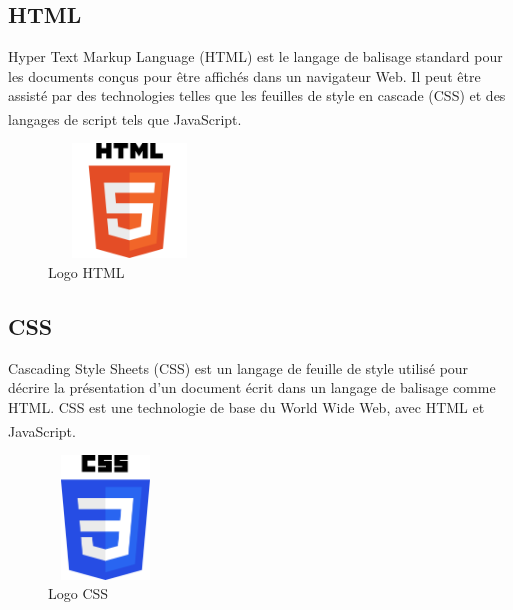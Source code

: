 \documentclass[12pt]{report}
\begin{document}
\subsection{HTML}

Hyper Text Markup Language (HTML) est le langage de balisage standard pour les documents conçus pour être affichés dans un navigateur Web. Il peut être assisté par des technologies telles que les feuilles de style en cascade (CSS) et des langages de script tels que JavaScript.\textsuperscript{\cite{robbins2012learning}}

\vspace{0.05in}

\begin{figure}[h]
\centering
    \includegraphics[width = 1.70in, height = 1.2in]{../Images/Html.png}
\caption{Logo HTML}
\end{figure}

\vspace*{-0.3in}

\subsection{CSS}

Cascading Style Sheets (CSS) est un langage de feuille de style utilisé pour décrire la présentation d'un document écrit dans un langage de balisage comme HTML. CSS est une technologie de base du World Wide Web, avec HTML et JavaScript.\textsuperscript{\cite{robbins2012learning}}

\vspace{-0.02in}

\begin{figure}[h]
\centering
    \includegraphics[width = 1.2in, height = 1.3in]{../Images/CSS.png}
\caption{Logo CSS}
\end{figure}
\end{document}
